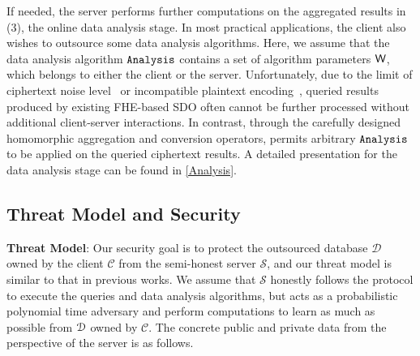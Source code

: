 



If needed, the server performs further computations on 
the aggregated results in (3), the online data analysis stage.
In most practical applications, the client 
also wishes to outsource some data analysis 
algorithms. Here, we assume that
the data analysis algorithm $\texttt{Analysis}$ contains a set of algorithm parameters  $\mathsf{W}$,
which belongs to either the client or the server.
Unfortunately, due to the limit of 
ciphertext noise level~\cite{aphadb, heda} or incompatible plaintext encoding~\cite{sagma},
queried results produced by existing FHE-based SDO often cannot be further 
processed without additional client-server interactions.
In contrast, through the carefully designed homomorphic aggregation and conversion operators,
\NAME permits arbitrary $\texttt{Analysis}$ to be applied on the queried ciphertext results.
A detailed presentation for the data analysis stage can be found in \cref{Analysis}.

\subsection{Threat Model and Security} \label{framework: threat_model}
{\bf{Threat Model}}: Our security goal is to protect the outsourced database $\mathcal{D}$
owned by the client $\mathcal{C}$ from the semi-honest server $\mathcal{S}$,
and our threat model is similar to that in previous works\cite{cryptdb, sagma, aphadb, 
sortinghat, heda}.
We assume that $\mathcal{S}$ honestly follows the protocol to
execute the queries and data analysis algorithms, but acts as 
a probabilistic polynomial time adversary and perform computations to 
learn as much as possible from $\mathcal{D}$ owned by $\mathcal{C}$.
The concrete public and private data from the perspective of the server is as follows. 

